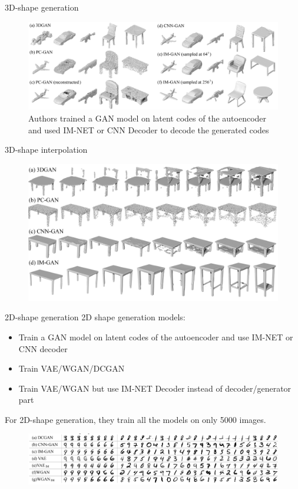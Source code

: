 \documentclass[handout, 10pt]{beamer}
\begin{document}
\begin{frame}{3D-shape generation}
    \begin{figure}
        \centering
        \includegraphics[width=\textwidth]{images/3d-generation-samples}
        \caption{Authors trained a GAN model on latent codes of the autoencoder and used IM-NET or CNN Decoder to decode the generated codes}
    \end{figure}
\end{frame}


\begin{frame}{3D-shape interpolation}
    \begin{figure}
        \centering
        \includegraphics[width=\textwidth]{images/3d-generation-interpolation-samples}
    \end{figure}
\end{frame}


\begin{frame}{2D-shape generation}
2D shape generation models:
\begin{itemize}
    \item\pause Train a GAN model on latent codes of the autoencoder and use IM-NET or CNN decoder
    \item\pause Train VAE/WGAN/DCGAN
    \item\pause Train VAE/WGAN but use IM-NET Decoder instead of decoder/generator part
\end{itemize}
\pause

For 2D-shape generation, they train all the models on only 5000 images.
    \begin{figure}
        \centering
        \includegraphics[width=\textwidth]{images/2d-generation-samples}
    \end{figure}
\end{frame}
\end{document}
